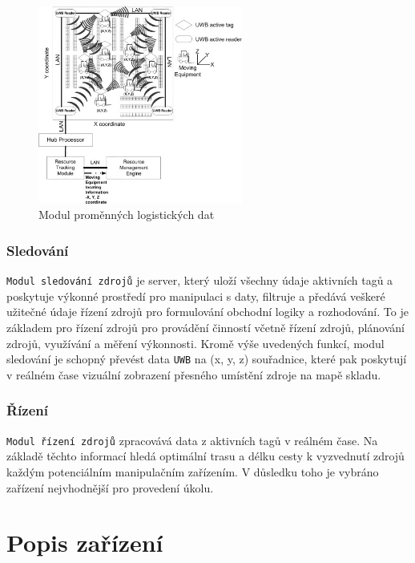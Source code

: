 \documentclass[czech,BP]{thesiskiv}
\begin{document}
\begin{figure}[H]
		\centering
		\includegraphics[width=0.6\textwidth]{../images/uwb.jpg}	
		\caption{Modul proměnných logistických dat\cite{chow2006design}}
		\label{fig:uwb}
\end{figure}


\subsection{Sledování}
\texttt{Modul sledování zdrojů} je server, který uloží všechny údaje aktivních tagů a poskytuje výkonné prostředí pro manipulaci s daty, filtruje a předává veškeré užitečné údaje řízení zdrojů pro formulování obchodní logiky a rozhodování. To je základem pro řízení zdrojů pro provádění činností včetně řízení zdrojů, plánování zdrojů, využívání a měření výkonnosti. Kromě výše uvedených funkcí, modul sledování je schopný převést data \texttt{UWB} na (x, y, z) souřadnice, které pak poskytují v reálném čase vizuální zobrazení přesného umístění zdroje na mapě skladu.\cite{chow2006design}

\subsection{Řízení}
\texttt{Modul řízení zdrojů} zpracovává data z aktivních tagů v reálném čase. Na základě těchto informací hledá optimální trasu a délku cesty k vyzvednutí zdrojů každým potenciálním manipulačním zařízením. V důsledku toho je vybráno zařízení nejvhodnější pro provedení úkolu.\cite{chow2006design}
	
\chapter{Popis zařízení}
\end{document}
